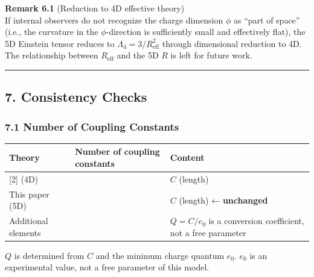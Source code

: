 \documentclass[a4paper,11pt]{article}
\theoremstyle{definition}
\begin{document}
\textbf{Remark 6.1} (Reduction to 4D effective theory)\\
If internal observers do not recognize the charge dimension \(\phi\) as ``part of space'' (i.e., the curvature in the \(\phi\)-direction is sufficiently small and effectively flat), the 5D Einstein tensor reduces to \(\Lambda_4 = 3/R_{\text{eff}}^2\) through dimensional reduction to 4D. The relationship between \(R_{\text{eff}}\) and the 5D \(R\) is left for future work.

\begin{center}\rule{0.5\linewidth}{0.5pt}\end{center}

\subsection{7. Consistency Checks}\label{consistency-checks}

\subsubsection{7.1 Number of Coupling Constants}\label{number-of-coupling-constants}

{\def\LTcaptype{none} %
\begin{longtable}[]{@{}
  >{\raggedright\arraybackslash}p{}
  >{\raggedright\arraybackslash}p{}
  >{\raggedright\arraybackslash}p{}@{}}
\toprule\noalign{}
\begin{minipage}[b]{\linewidth}\raggedright
Theory
\end{minipage} & \begin{minipage}[b]{\linewidth}\raggedright
Number of coupling constants
\end{minipage} & \begin{minipage}[b]{\linewidth}\raggedright
Content
\end{minipage} \\
\midrule\noalign{}
\endhead
\bottomrule\noalign{}
\endlastfoot
{[}2{]} (4D) & 1 & \(C\) (length) \\
This paper (5D) & 1 & \(C\) (length) ← \textbf{unchanged} \\
Additional elements & 0 & \(Q = C/e_0\) is a conversion coefficient, not a free parameter \\
\end{longtable}
}

\(Q\) is determined from \(C\) and the minimum charge quantum \(e_0\). \(e_0\) is an experimental value, not a free parameter of this model.
\end{document}
